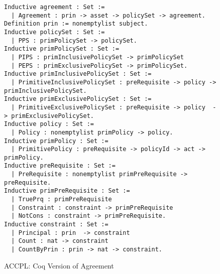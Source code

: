 \documentclass[conference]{IEEEtran}
\begin{document}
\lstset{language=Coq, captionpos=b}
\begin{figure*}
\begin{lstlisting}
Inductive agreement : Set :=
  | Agreement : prin -> asset -> policySet -> agreement.
Definition prin := nonemptylist subject.
Inductive policySet : Set :=
  | PPS : primPolicySet -> policySet.
Inductive primPolicySet : Set :=
  | PIPS : primInclusivePolicySet -> primPolicySet
  | PEPS : primExclusivePolicySet -> primPolicySet.
Inductive primInclusivePolicySet : Set :=
  | PrimitiveInclusivePolicySet : preRequisite -> policy -> primInclusivePolicySet.
Inductive primExclusivePolicySet : Set :=
  | PrimitiveExclusivePolicySet : preRequisite -> policy  -> primExclusivePolicySet.
Inductive policy : Set :=
  | Policy : nonemptylist primPolicy -> policy.
Inductive primPolicy : Set :=
  | PrimitivePolicy : preRequisite -> policyId -> act -> primPolicy.  
Inductive preRequisite : Set :=
  | PreRequisite : nonemptylist primPreRequisite -> preRequisite.
Inductive primPreRequisite : Set :=
  | TruePrq : primPreRequisite
  | Constraint : constraint -> primPreRequisite
  | NotCons : constraint -> primPreRequisite.
Inductive constraint : Set :=
  | Principal : prin  -> constraint 
  | Count : nat -> constraint 
  | CountByPrin : prin -> nat -> constraint.  
\end{lstlisting}
\caption{ACCPL: Coq Version of Agreement}
\label{fig:agreementcoq}
\end{figure*}

%
\end{document}
